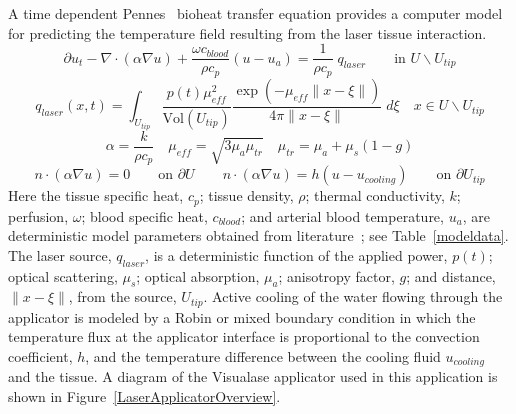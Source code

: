 \documentclass[12pt]{article}
\begin{document}
A time dependent Pennes~\cite{Pennes1948} bioheat transfer equation
provides a computer model for predicting the temperature field resulting
from the laser tissue interaction. 
\begin{equation} \label{BioheatPDE}
  \partial u_t   
 -\nabla \cdot  (   \alpha \nabla u  ) 
 + \frac{\omega c_\textit{blood}}{\rho c_p} (u  - u_a )
 = \frac{1}{\rho c_p} \; q_{laser}
     \qquad \text{in } U \backslash U_{tip}
\end{equation}
\[
   q_{laser}(x,t)  = 
    \int_{U_{tip}}
 \frac{p(t) \mu_\textit{eff}^2}{\text{Vol}(U_{tip}) }  
   \frac{ \exp(-\mu_\textit{eff} \| x -{ \xi}\|) }
      {4\pi \| x-{ \xi}\|} \; d\xi
   \quad   x \in U \backslash U_{tip}
\]
\[
  \alpha  = \frac{k}{\rho c_p}
\quad
  \mu_{eff}  = \sqrt{ 3 {\mu_a} \mu_{tr} }
\quad
 \mu_{tr} = \mu_a  + \mu_s (1-g)
\]
\[
n \cdot ( \alpha \nabla u  )  = 0 
                       \qquad \text{on } \partial U
\qquad
n \cdot ( \alpha \nabla u  )  = h (u - u_\textit{cooling}) 
                       \qquad \text{on } \partial U_\textit{tip}
\]
Here the tissue specific heat, $c_p$; tissue density, $\rho$;
thermal conductivity, $k$; perfusion, $\omega$; blood specific
heat, $c_{blood}$; 
and arterial blood temperature, $u_a$,
are deterministic model parameters 
obtained from literature~\cite{Handbook05,Welch95,duck1990}; 
see Table~\ref{modeldata}.
The laser source, $q_{laser}$, is a deterministic function of the
applied power, $p(t)$; optical
scattering, $\mu_s$; optical absorption, $\mu_a$; anisotropy factor, $g$;
and distance, $\|x-\xi\|$, from the source, $U_{tip}$.
Active cooling of the water flowing through the applicator is modeled 
by a Robin or mixed boundary condition in which the temperature flux at
the applicator interface is proportional to  the convection coefficient,
$h$, and the temperature difference between the cooling fluid
$u_\textit{cooling}$ and the tissue. A diagram of the 
Visualase\textsuperscript{\textregistered} applicator used
in this application is shown in Figure~\ref{LaserApplicatorOverview}.
\end{document}

